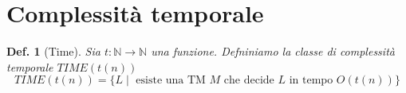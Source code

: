 \documentclass[11pt]{article}
\newtheorem{definition}{Def.}[section]
\newtheorem{proof}{Dimostrazione}[section]
\begin{document}
\begin{comment}
\begin{proof}
	Si supponge che $EQ_{TM}$ sia decidibile e si costruisce una TM $T$ che
	decide $A_{TM}$. Sia $R$ un decisore di $EQ_{TM}$:\\

	$T = $ ``Sulla stringa di input $\langle M, w \rangle$, dove $M$ è una TM e
	$w$ è una stringa:
	\begin{enumerate}
		\item usa $M$ e $w$ per costruire la TM $M_2$:\\

			$M_2 = $ ``Sulla stringa di input $x$:
			\begin{enumerate}
				\item se $x \neq w$ rifiuta;
				\item se $x = w$ simula $M$ sull'input $w$;
				\item se $M$ accetta, accetta, se $M$ rifiuta, rifiuta;''
			\end{enumerate}

		\item costruisce la TM $M_3$:\\

			$M_3 = $ ``Sulla stringa di input $x$:
			\begin{enumerate}
				\item se $x = w$ accetta, altrimenti rifiuta;''
			\end{enumerate}

		\item simula $R$ sull'input $\langle M_2, M_3 \rangle$;

		\item se $R$ accetta, accetta; se $R$ rifiuta, rifiuta;''
	\end{enumerate}

	Se $M$ accetta $w$ allora $L(M_2) = \{ w \} = L(M_3)$, quindi $R$ accetta.
	Se $M$ rifiuta $w$ allora $L(M_2) = \emptyset \neq L(M_3)$, quindi $R$
	rifiuta. $T$ è un decisore di $A_{TM}$, questo è assurdo, ma allora $R$ non
	può essere un decisore di $EQ_{TM}$. Dunque $EQ_{TM}$ è indecidibile.
\end{proof}
\end{comment}

\section{Complessità temporale}

\begin{definition}[Time]
	Sia $t: \mathbb{N} \rightarrow \mathbb{N}$ una funzione. Defniniamo la
	classe di complessità temporale $TIME(t(n))$
	\begin{equation}
		TIME(t(n)) = \{L \mid \text{ esiste una TM $M$ che decide $L$ in tempo
		$O(t(n))$}\}
	\end{equation}
\end{definition}
\end{document}
